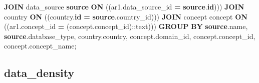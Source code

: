 \documentclass[
]{book}
\newenvironment{Shaded}{\begin{snugshade}}{\end{snugshade}}
\newcommand{\CharTok}[1]{\textcolor[rgb]{0.31,0.60,0.02}{#1}}
\newcommand{\KeywordTok}[1]{\textcolor[rgb]{0.13,0.29,0.53}{\textbf{#1}}}
\newcommand{\NormalTok}[1]{#1}
\newcommand{\OperatorTok}[1]{\textcolor[rgb]{0.81,0.36,0.00}{\textbf{#1}}}
\begin{document}
\begin{Shaded}
\begin{Highlighting}[]
    \KeywordTok{JOIN}\NormalTok{ data\_source }\KeywordTok{source} \KeywordTok{ON}\NormalTok{ ((ar1.data\_source\_id }\OperatorTok{=} \KeywordTok{source}\NormalTok{.}\KeywordTok{id}\NormalTok{)))}
    \KeywordTok{JOIN}\NormalTok{ country }\KeywordTok{ON}\NormalTok{ ((country.}\KeywordTok{id} \OperatorTok{=} \KeywordTok{source}\NormalTok{.country\_id)))}
    \KeywordTok{JOIN}\NormalTok{ concept concept }\KeywordTok{ON}\NormalTok{ ((ar1.concept\_id }\OperatorTok{=}\NormalTok{ (concept.concept\_id):}\CharTok{:text}\NormalTok{)))}
 \KeywordTok{GROUP} \KeywordTok{BY} \KeywordTok{source}\NormalTok{.name, }\KeywordTok{source}\NormalTok{.database\_type, country.country, concept.domain\_id, concept.concept\_id, concept.concept\_name;}
\end{Highlighting}
\end{Shaded}

\hypertarget{data_density}{%
\subsection*{data\_density}\label{data_density}}
\end{document}
